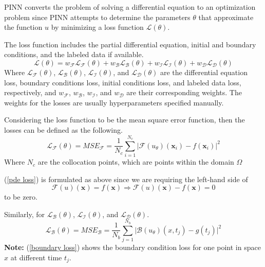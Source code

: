 \documentclass[a4paper,12pt]{article}
\theoremstyle{definition}
\begin{document}
PINN converts the problem of solving a differential equation 
to an optimization problem since PINN attempts to determine the parameters $\theta$ 
that approximate the function $u$ by minimizing a loss function $\mathcal{L}(\theta)$\cite{cuomo2022scientific}.

The loss function includes the partial differential equation, initial and boundary conditions, and 
the labeled data if available.
\begin{equation}
\mathcal{L}(\theta) = w_{\mathcal{F}} \mathcal{L}_{\mathcal{F}}(\theta)
+ w_{\mathcal{B}} \mathcal{L}_{\mathcal{B}}(\theta) 
+ w_{\mathcal{I}} \mathcal{L}_{\mathcal{I}}(\theta)
+ w_{\mathcal{D}} \mathcal{L}_{\mathcal{D}}(\theta)
\end{equation}
Where $\mathcal{L}_{\mathcal{F}}(\theta)$, $\mathcal{L}_{\mathcal{B}}(\theta)$, 
$\mathcal{L}_{\mathcal{I}}(\theta)$, and $\mathcal{L}_{\mathcal{D}}(\theta)$ are the differential equation loss,
boundary conditions loss, initial conditions loss, and labeled data loss, respectively, and $w_{\mathcal{F}}$, 
$w_{\mathcal{B}}$, $w_{\mathcal{I}}$, and $w_{\mathcal{D}}$ are their corresponding weights. 
The weights for the losses are usually hyperparameters specified manually.

Considering the loss function to be the mean square error function, then the losses can be 
defined as the following.
\begin{equation}\label{pde loss}
\mathcal{L}_{\mathcal{F}}(\theta) = MSE_{\mathcal{F}} 
= \frac{1}{N_c} \sum_{i=1}^{N_c} \bigg| \mathcal{F}(u_\theta)(\mathbf{x}_i) - f(\mathbf{x}_i) \bigg|^2
\end{equation}
Where $N_c$ are the collocation points, which are points within the domain $\Omega$

(\ref{pde loss}) is formulated as above since we are requiring the left-hand side of 
$$
\mathcal{F}(u)(\mathbf{x}) = f(\mathbf{x})  \Rightarrow 
\mathcal{F}(u)(\mathbf{x}) - f(\mathbf{x}) = 0
$$
to be zero.

Similarly, for $\mathcal{L}_{\mathcal{B}}(\theta)$,  $\mathcal{L}_{\mathcal{I}}(\theta)$, and 
$\mathcal{L}_{\mathcal{D}}(\theta)$.
\begin{equation}\label{boundary loss}
\mathcal{L}_{\mathcal{B}}(\theta) = MSE_{\mathcal{B}} 
= \frac{1}{N_b} \sum_{j=1}^{N_b} \bigg| \mathcal{B}(u_\theta)(x, t_j) - g(t_j) \bigg|^2
\end{equation}
\textbf{Note:} (\ref{boundary loss}) shows the boundary condition loss for one point in space $x$ 
at different time $t_j$. 
\end{document}

